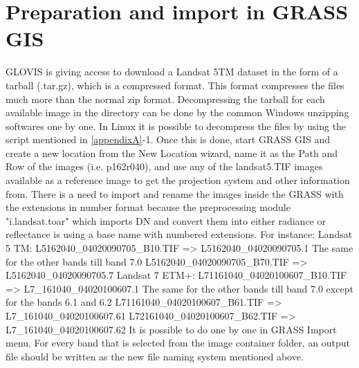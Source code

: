 \section{Preparation and import in GRASS GIS}
GLOVIS is giving access to download a Landsat 5TM dataset in the form of a tarball (.tar.gz), which is a compressed format. This format compresses the files much more than the normal zip format. Decompressing the tarball for each available image in the directory can be done by the common Windows unzipping softwares one by one.\newline\linebreak
In Linux it is possible to decompress the files by using the script mentioned in \ref{appendixA}-1.\newline
Once this is done, start GRASS GIS and create a new location from the New Location wizard, name it as the Path and Row of the images (i.e. p162r040), and use any of the landsat5.TIF images available as a reference image to get the projection system and other information from.\newline
There is a need to import and rename the images inside the GRASS with the extensions in number format because the preprocessing module "i.landsat.toar" which imports DN and convert them into either radiance or reflectance is using a base name with numbered extensions.  For instance:\newline\linebreak
Landsat 5 TM:\newline
L5162040\_04020090705\_B10.TIF \newline
=> L5162040\_04020090705.1\newline
The same for the other bands till band 7.0\newline
L5162040\_04020090705\_B70.TIF \newline
=> L5162040\_04020090705.7\newline\linebreak
Landsat 7 ETM+:\newline
L71161040\_04020100607\_B10.TIF \newline
=> L7\_161040\_04020100607.1\newline
The same for the other bands till band 7.0 except for the bands 6.1 and 6.2\newline
L71161040\_04020100607\_B61.TIF \newline
=> L7\_161040\_04020100607.61\newline
L72161040\_04020100607\_B62.TIF \newline
=> L7\_161040\_04020100607.62\newline\linebreak
It is possible to do one by one in GRASS Import menu. For every band that is selected from the image container folder, an output file should be written as the new file naming system mentioned above.\newline

